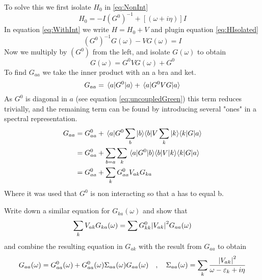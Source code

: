 \begin{solution}
To solve this we first isolate $H_0$ in \eqref{eq:NonInt}
\begin{equation}
    H_0 = -I (G^0)^{-1} + \left[(\omega + i \eta) \right]I
    \label{eq:HIsolated}
\end{equation}
In equation \ref{eq:WithInt} we write $H = H_0 + V$ and plugin equation \ref{eq:HIsolated}
\begin{equation}
    (G^0)^{-1}G(\omega) - V G(\omega) = I
\end{equation}
Now we multiply by $(G^0)$ from the left, and isolate $G(\omega)$ to obtain
\begin{equation}\label{eq:NA210}
    G(\omega) = G^0 V G(\omega) + G^0
\end{equation}
To find $G_{aa}$ we take the inner product with an a bra and ket.
\begin{equation}
    G_{aa} = \mel{a}{G^{0}}{a} + \mel{a}{G^{0}VG}{a}
\end{equation}
As $G^{0}$ is diagonal in $a$ (see equation \ref{eq:uncoupledGreen}) this term reduces trivially, and the remaining term can be found by introducing several "ones" in a spectral representation.
\begin{align}
    G_{aa} &= G^{0}_{aa} + \mel{a}{G^{0}\sum_b|b\rangle\langle b |V\sum_k|k\rangle\langle k |G}{a} \\
    &= G^{0}_{aa} + \sum_{b=a}\sum_k\mel{a}{G^{0}|b\rangle\langle b |V|k\rangle\langle k |G}{a}\\
    &= G^{0}_{aa} + \sum_k G^{0}_{aa}V_{ak}G_{ka} \label{eq:NA114}
\end{align}
Where it was used that $G^0$ is non interacting so that a has to equal b.
\end{solution}
\begin{exercise}
Write down a similar equation for $G_{ka}(\omega)$ and show that
\begin{equation}
    \sum_{k}V_{ak}G_{ka}(\omega) = \sum G_{kk}^{0}\abs{V_{ak}}^2G_{aa}(\omega)
\end{equation}
and combine the resulting equation in $G_{ak}$ with the result from $G_{aa}$ to obtain
\begin{equation}
    G_{aa}(\omega) = G_{aa}^{0}(\omega) + G_{aa}^{0}(\omega)\Sigma_{aa}(\omega)G_{aa}(\omega) \quad,\quad \Sigma_{aa}(\omega)=\sum_{k}\dfrac{\abs{V_{ak}}^2}{\omega-\varepsilon_k+i\eta}
\end{equation}
\end{exercise}

